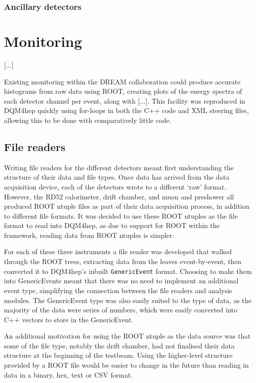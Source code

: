 \subsubsection{Ancillary detectors}


\section{Monitoring}
[...]

Existing monitoring within the \acrshort{DREAM} collaboration could produce accurate histograms from raw data using ROOT, creating plots of the energy spectra of each detector channel per event, along with [...]. This facility was reproduced in \acrshort{DQM4hep} quickly using for-loops in both the C++ code and \acrshort{XML} steering files, allowing this to be done with comparatively little code.

\subsection{File readers}
Writing file readers for the different detectors meant first understanding the structure of their data and file types. Once data has arrived from the data acquisition device, each of the detectors wrote to a different `raw' format. However, the RD52 calorimeter, drift chamber, and muon and preshower all produced ROOT ntuple files as part of their data acquisition process, in addition to different file formats. It was decided to use these ROOT ntuples as the file format to read into \acrshort{DQM4hep}, as due to support for ROOT within the framework, reading data from ROOT ntuples is simpler.

For each of these three instruments a file reader was developed that walked through the ROOT trees, extracting data from the leaves event-by-event, then converted it to \acrshort{DQM4hep}'s inbuilt \texttt{GenericEvent} format. Choosing to make them into GenericEvents meant that there was no need to implement an additional event type, simplifying the connection between the file readers and analysis modules. The GenericEvent type was also easily suited to the type of data, as the majority of the data were series of numbers, which were easily converted into C++ vectors to store in the GenericEvent.

An additional motivation for using the ROOT ntuple as the data source was that some of the file type, notably the drift chamber, had not finalised their data structure at the beginning of the testbeam. Using the higher-level structure provided by a ROOT file would be easier to change in the future than reading in data in a binary, hex, text or \acrshort{CSV} format.

